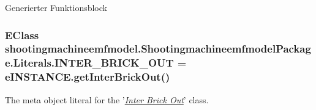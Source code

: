 Generierter Funktionsblock \hypertarget{interfaceshootingmachineemfmodel_1_1_shootingmachineemfmodel_package_1_1_literals_a6e54dbc9616d23f7886fc22da418e631}{
\subsubsection[{I\-N\-T\-E\-R\-\_\-\-B\-R\-I\-C\-K\-\_\-\-O\-U\-T}]{\setlength{\rightskip}{0pt plus 5cm}E\-Class shootingmachineemfmodel.\-Shootingmachineemfmodel\-Package.\-Literals.\-I\-N\-T\-E\-R\-\_\-\-B\-R\-I\-C\-K\-\_\-\-O\-U\-T = e\-I\-N\-S\-T\-A\-N\-C\-E.\-get\-Inter\-Brick\-Out()}}\label{interfaceshootingmachineemfmodel_1_1_shootingmachineemfmodel_package_1_1_literals_a6e54dbc9616d23f7886fc22da418e631}
The meta object literal for the '\hyperlink{classshootingmachineemfmodel_1_1impl_1_1_inter_brick_out_impl}{{\itshape Inter Brick Out}}' class.

